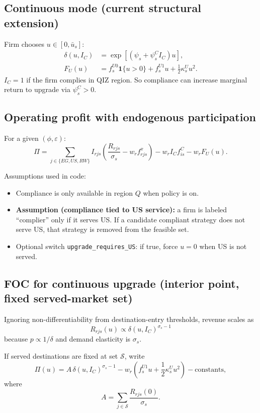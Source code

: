 \documentclass[11pt]{article}
\begin{document}
\subsection{Continuous mode (current structural extension)}
Firm chooses $u\in[0,\bar u_s]$:
\begin{align}
\delta(u,I_C) &= \exp\!\left[(\psi_s+\psi^C_s I_C)u\right],\\
F_U(u) &= f^{U0}_s\mathbf 1\{u>0\}+f^{U1}_s u+\frac{1}{2}\kappa^U_s u^2.
\label{eq:upgrade_cost}
\end{align}
$I_C=1$ if the firm complies in QIZ region.
So compliance can increase marginal return to upgrade via $\psi^C_s>0$.

\subsection{Operating profit with endogenous participation}
For a given $(\phi,\varepsilon)$:
\begin{equation}
\Pi =
\sum_{j\in\{EG,US,RW\}}
I_{rjs}\left(\frac{R_{rjs}}{\sigma_s}-w_r f^x_{rjs}\right)
-w_r I_C f^C_{is}
-w_r F_U(u).
\label{eq:total_profit}
\end{equation}

Assumptions used in code:
\begin{itemize}
    \item Compliance is only available in region $Q$ when policy is on.
    \item \textbf{Assumption (compliance tied to US service):} a firm is labeled ``complier'' only if it serves US. If a candidate compliant strategy does not serve US, that strategy is removed from the feasible set.
    \item Optional switch \texttt{upgrade\_requires\_US}: if true, force $u=0$ when US is not served.
\end{itemize}

\subsection{FOC for continuous upgrade (interior point, fixed served-market set)}
Ignoring non-differentiability from destination-entry thresholds, revenue scales as
\[
R_{rjs}(u)\propto \delta(u,I_C)^{\sigma_s-1}
\]
because $p\propto 1/\delta$ and demand elasticity is $\sigma_s$.

If served destinations are fixed at set $\mathcal S$, write
\[
\Pi(u)=A\,\delta(u,I_C)^{\sigma_s-1}-w_r\!\left(f^{U1}_s u+\frac12\kappa^U_s u^2\right)-\text{constants},
\]
where
\[
A=\sum_{j\in\mathcal S}\frac{R_{rjs}(0)}{\sigma_s}.
\]
\end{document}

